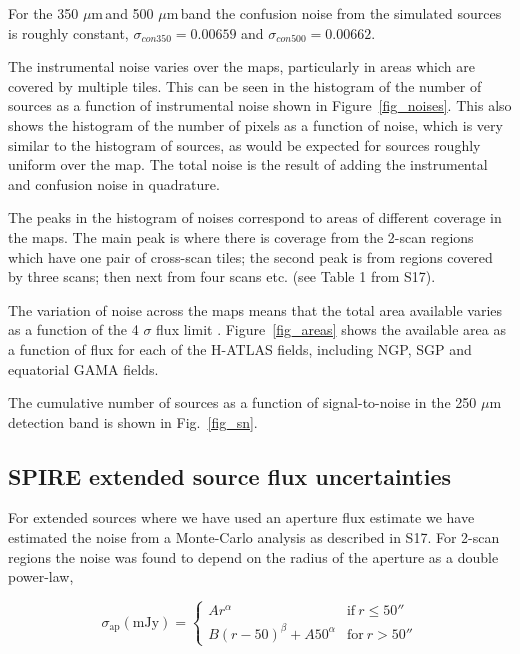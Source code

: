 \documentclass[useAMS,usenatbib]{mn2e}
\def\mic{ $\mu $m\,}
\begin{document}
For the 350\mic and 500\mic band the confusion noise from the simulated
sources is roughly constant, $\sigma_{con350} = 0.00659$ and
$\sigma_{con500} = 0.00662$.

The instrumental noise varies over the maps, particularly in areas
which are covered by multiple tiles. This can be seen in the histogram
of the number of sources as a function of instrumental noise shown in
Figure~\ref{fig_noises}. This also shows the histogram of the number
of pixels as a function of noise, which is very similar to the
histogram of sources, as would be expected for sources roughly uniform
over the map.  The total noise is the result of adding the
instrumental and confusion noise in quadrature.

The peaks in the histogram of noises correspond to areas of different
coverage in the maps. The main peak is where there is coverage from
the 2-scan regions which have one pair of cross-scan tiles; the second
peak is from regions covered by three scans; then next from four scans
etc. (see Table 1 from S17).

The variation of noise across the maps means that the total area
available varies as a function of the 4 $\sigma$ flux limit
. Figure~\ref{fig_areas} shows the available area as a function of
flux for each of the H-ATLAS fields, including NGP, SGP and equatorial
GAMA fields.




The cumulative number of sources as a function of signal-to-noise in
the 250\mic detection band is shown in Fig.~\ref{fig_sn}.


\subsection{SPIRE extended source flux uncertainties} 
For extended sources where we have used an aperture flux estimate we
have estimated the noise from a Monte-Carlo analysis as described in
S17. For 2-scan regions the noise was found to depend on the radius of
the aperture as a double power-law, 

\begin{equation} 
  \sigma_{\mathrm{ap}}(\mathrm{mJy}) =
  \begin{cases} 
      Ar^\alpha &   \mathrm{if\ } r\le 50'' \\
      B(r-50)^\beta + A 50^\alpha & \mathrm{for\ } r>50'' 
    \end{cases}
\end{equation} 
\end{document}

